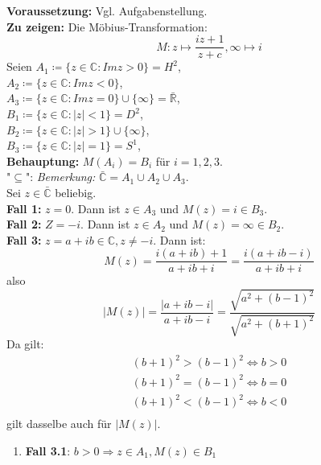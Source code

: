 \begin{problem*}[4]
\textbf{Voraussetzung:} Vgl. Aufgabenstellung.\\
\textbf{Zu zeigen:} Die Möbius-Transformation:
\begin{equation*}
  M: z \mapsto \frac{iz + 1}{z + c}, \infty \mapsto i
\end{equation*}
Seien $A_1 \coloneqq \{ z \in \mathbb{C}: Im z > 0 \} = H^2 $, \\
$ A_2 \coloneqq \{  z \in \mathbb{C}: Im z < 0 \}$,\\
$ A_3 \coloneqq \{  z \in \mathbb{C}: Im z = 0 \} \cup \{ \infty \} = \bar{\mathbb{R}}$,\\
$B_1 \coloneqq \{ z \in \mathbb{C} : \vert z \vert < 1\} = D^2$, \\
$B_2 \coloneqq \{ z \in \mathbb{C} : \vert z \vert > 1\} \cup \{ \infty \}$,\\
$B_3 \coloneqq \{ z \in \mathbb{C} : \vert z \vert = 1\} = S^1 $,\\
\textbf{Behauptung:} $M(A_i) = B_i $ für $i = 1, 2, 3$. \\
"$\subseteq$": \emph{Bemerkung:} $\bar{\mathbb{C}}  = A_1 \cup A_2 \cup A_3$. \\
Sei $z \in \bar{\mathbb{C}} $ beliebig.\\
\textbf{Fall 1:} $z = 0$. Dann ist $z \in A_3$ und $M(z) = i \in B_3$. \\
\textbf{Fall 2:} $Z = -i$. Dann ist $z \in A_2$ und $M(z) = \infty \in B_2$.\\
\textbf{Fall 3:} $z = a+ib \in \mathbb{C}, z \neq -i$. Dann ist:
\begin{equation*}
  M(z) = \frac{i(a+ib) + 1}{a + ib + i} = \frac{i (a+ib -i)}{a + ib + i}
\end{equation*}
also
\begin{equation*}
\vert M(z) \vert = \frac{\vert a+ib-i \vert}{a+ib-i} = \frac{\sqrt{ a^2 + (b-1)^2 }}{\sqrt{ a^2 + (b+1)^2 }}
\end{equation*}
Da gilt:
\begin{align*}
 (b+1)^2 > (b-1)^2 \Leftrightarrow b > 0 \\
 (b+1)^2 = (b-1)^2 \Leftrightarrow b = 0 \\
 (b+1)^2 < (b-1)^2 \Leftrightarrow b < 0 \\
\end{align*}
gilt dasselbe auch für $\vert M(z) \vert$.
\begin{enumerate}
  \item \textbf{Fall 3.1}: $b > 0 \Rightarrow z \in A_1, M(z) \in B_1$

\end{enumerate}
\end{problem*}
